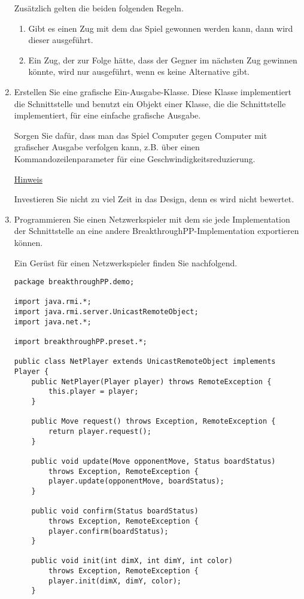 \begin{enumerate}
Zusätzlich gelten die beiden folgenden Regeln.
\begin{enumerate}[label=\alph*)]
\item Gibt es einen Zug mit dem das Spiel gewonnen werden kann, dann wird dieser ausgeführt.
\item Ein Zug, der zur Folge hätte, dass der Gegner im nächsten Zug gewinnen könnte, wird nur ausgeführt, wenn es keine Alternative gibt.
\end{enumerate}
\item Erstellen Sie eine grafische Ein-Ausgabe-Klasse. Diese Klasse implementiert die Schnittstelle  und benutzt ein Objekt einer Klasse, die die Schnittstelle  implementiert, für eine einfache grafische Ausgabe.

Sorgen Sie dafür, dass man das Spiel Computer gegen Computer mit grafischer Ausgabe verfolgen kann, z.B. über einen Kommandozeilenparameter für eine Geschwindigkeitsreduzierung.

\underline{Hinweis}

Investieren Sie nicht zu viel Zeit in das Design, denn es wird nicht bewertet.
\item Programmieren Sie einen Netzwerkspieler mit dem sie jede Implementation der Schnittstelle  an eine andere BreakthroughPP-Implementation exportieren können.

Ein Gerüst für einen Netzwerkspieler finden Sie nachfolgend.
\begin{lstlisting}
package breakthroughPP.demo;

import java.rmi.*;
import java.rmi.server.UnicastRemoteObject;
import java.net.*;

import breakthroughPP.preset.*;

public class NetPlayer extends UnicastRemoteObject implements Player {
	public NetPlayer(Player player) throws RemoteException {
		this.player = player;
	}
	
	public Move request() throws Exception, RemoteException {
		return player.request();
	}
	
	public void update(Move opponentMove, Status boardStatus)
		throws Exception, RemoteException {
		player.update(opponentMove, boardStatus);
	}
	
	public void confirm(Status boardStatus)
		throws Exception, RemoteException {
		player.confirm(boardStatus);
	}		
	
	public void init(int dimX, int dimY, int color)
		throws Exception, RemoteException {
		player.init(dimX, dimY, color);	
	} 
	

\end{lstlisting}
\end{enumerate}
